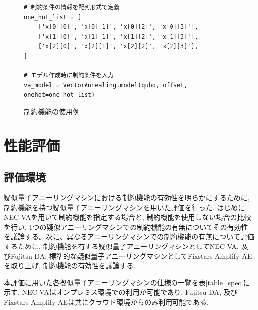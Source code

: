 \documentclass[submit,techrep,noauthor]{ipsj}
\newcounter{sourcecodefigure}
\newcounter{normalfigure}
\newcommand{\switchtosourcecode}{%
    \setcounter{normalfigure}{\value{figure}}
    \setcounter{figure}{\value{sourcecodefigure}}
}
\newcommand{\switchtonormal}{%
    \setcounter{sourcecodefigure}{\value{figure}}
    \setcounter{figure}{\value{normalfigure}}
}
\newcommand\sourcecodeposition{h}
\newenvironment{sourcecode}[1][h]{%
    \begin{figure}[#1]
    \renewcommand\sourcecodeposition{#1}
    \centering
    \captionsetup{name=ソースコード}
    \switchtosourcecode
    \ifthenelse{\equal{\sourcecodeposition}{t}}%
        {\vspace{-1.3zh}} %
        {\ifthenelse{\equal{\sourcecodeposition}{b}}%
            {\vspace{-2zh}} %
            {\vspace{-2zh}} %
    }
}{%
    \ifthenelse{\equal{\sourcecodeposition}{t}}%
        {\vspace{-1.3zh}} %
        {\ifthenelse{\equal{\sourcecodeposition}{b}}%
            {\vspace{-1zh}} %
            {\vspace{-3zh}} %
    }
    \switchtonormal
    \end{figure}
}
\begin{document}
\begin{sourcecode}[tb] %
\caption{制約機能の使用例}\label{code:nec_va}
\begin{lstlisting}
# 制約条件の情報を配列形式で定義
one_hot_list = [
    ['x[0][0]', 'x[0][1]', 'x[0][2]', 'x[0][3]'],
    ['x[1][0]', 'x[1][1]', 'x[1][2]', 'x[1][3]'],
    ['x[2][0]', 'x[2][1]', 'x[2][2]', 'x[2][3]'],
]

# モデル作成時に制約条件を入力
va_model = VectorAnnealing.model(qubo, offset, onehot=one_hot_list)
\end{lstlisting}
\vspace{5mm}
\end{sourcecode}

\section{性能評価}

\subsection{評価環境}
疑似量子アニーリングマシンにおける制約機能の有効性を明らかにするために, 制約機能を持つ疑似量子アニーリングマシンを用いた評価を行った. はじめに, NEC VAを用いて制約機能を指定する場合と, 制約機能を使用しない場合の比較を行い, 1つの疑似アニーリングマシンでの制約機能の有無についてその有効性を議論する。次に、異なるアニーリングマシンでの制約機能の有無について評価するために, 制約機能を有する疑似量子アニーリングマシンとしてNEC VA, 及びFujitsu DA, 標準的な疑似量子アニーリングマシンとしてFixstars Amplify AEを取り上げ, 制約機能の有効性を議論する.

本評価に用いた各擬似量子アニーリングマシンの仕様の一覧を表\ref{table_spec}に示す. NEC VAはオンプレミス環境での利用が可能であり, Fujitsu DA, 及びFixstars Amplify AEは共にクラウド環境からのみ利用可能である.

\end{document}
